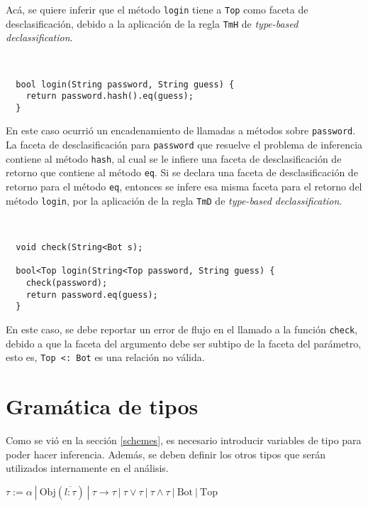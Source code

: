 Acá, se quiere inferir que el método \texttt{login} tiene a \texttt{Top} como faceta de desclasificación, debido a la aplicación de la regla \texttt{TmH} de \textit{type-based declassification}.

\begin{ej} \ \\
  \normalfont
\begin{lstlisting}
  bool login(String password, String guess) {
    return password.hash().eq(guess);
  }
\end{lstlisting}
\end{ej}

En este caso ocurrió un encadenamiento de llamadas a métodos sobre \texttt{password}. La faceta de desclasificación para \texttt{password} que resuelve el problema de inferencia contiene al método \texttt{hash}, al cual se le infiere una faceta de desclasificación de retorno que contiene al método \texttt{eq}. Si se declara una faceta de desclasificación de retorno para el método \texttt{eq}, entonces se infere esa misma faceta para el retorno del método \texttt{login}, por la aplicación de la regla \texttt{TmD} de \textit{type-based declassification}.

\begin{ej} \ \\
  \normalfont
\begin{lstlisting}
  void check(String<Bot s);

  bool<Top login(String<Top password, String guess) {
    check(password);
    return password.eq(guess);
  }
\end{lstlisting}
\end{ej}

En este caso, se debe reportar un error de flujo en el llamado a la función \texttt{check}, debido a que la faceta del argumento debe ser subtipo de la faceta del parámetro, esto es, \texttt{Top <: Bot} es una relación no válida.

\section{Gramática de tipos}
Como se vió en la sección \ref{schemes}, es necesario introducir variables de tipo para poder hacer inferencia. Además, se deben definir los otros tipos que serán utilizados internamente en el análisis.

\begin{defn}
  \normalfont
  $\tau := \alpha\ |\ \text{Obj}(\overline{l: \tau})\ |\ \tau \rightarrow \tau \ |\ \tau \vee \tau\ |\ \tau \wedge \tau \ |\ \text{Bot}\ |\ \text{Top}$
\end{defn}

